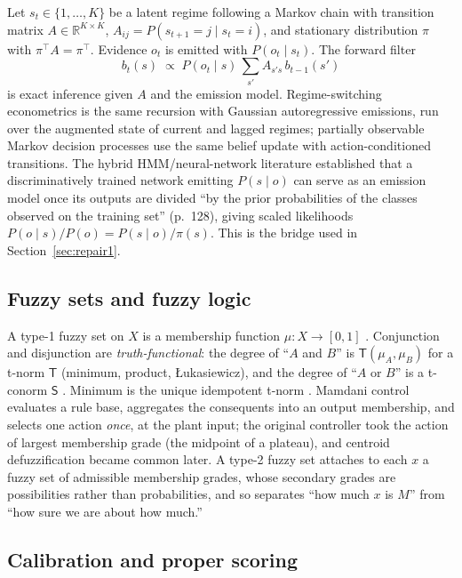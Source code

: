 \documentclass[11pt,a4paper]{article}
\numberwithin{equation}{section}
\theoremstyle{plain}
\theoremstyle{definition}
\theoremstyle{remark}
\newcommand{\R}{\mathbb{R}}
\begin{document}
Let $s_t \in \{1,\dots,K\}$ be a latent regime following a Markov chain with transition matrix $A \in \R^{K\times K}$, $A_{ij} = P(s_{t+1}=j \mid s_t=i)$, and stationary distribution $\pi$ with $\pi^\top A = \pi^\top$. Evidence $o_t$ is emitted with $P(o_t \mid s_t)$. The forward filter \citep{rabiner1989}
\begin{equation}\label{eq:filter}
b_t(s) \;\propto\; P(o_t \mid s)\,\sum_{s'} A_{s's}\, b_{t-1}(s')
\end{equation}
is exact inference given $A$ and the emission model. Regime-switching econometrics \citep{hamilton1989} is the same recursion with Gaussian autoregressive emissions, run over the augmented state of current and lagged regimes; partially observable Markov decision processes \citep{kaelbling1998} use the same belief update with action-conditioned transitions. The hybrid HMM/neural-network literature \citep{bourlard1994} established that a discriminatively trained network emitting $P(s\mid o)$ can serve as an emission model once its outputs are divided ``by the prior probabilities of the classes observed on the training set'' (p.~128), giving scaled likelihoods $P(o\mid s)/P(o) = P(s\mid o)/\pi(s)$. This is the bridge used in Section~\ref{sec:repair1}.

\subsection{Fuzzy sets and fuzzy logic}

A type-1 fuzzy set on $X$ is a membership function $\mu: X \to [0,1]$ \citep{zadeh1965}. Conjunction and disjunction are \emph{truth-functional}: the degree of ``$A$ and $B$'' is $\mathsf T(\mu_A,\mu_B)$ for a t-norm $\mathsf T$ (minimum, product, {\L}ukasiewicz), and the degree of ``$A$ or $B$'' is a t-conorm $\mathsf S$ \citep{klement2000}. Minimum is the unique idempotent t-norm \citep{klement2000}. Mamdani control \citep{mamdani1975} evaluates a rule base, aggregates the consequents into an output membership, and selects one action \emph{once}, at the plant input; the original controller took the action of largest membership grade (the midpoint of a plateau), and centroid defuzzification became common later. A type-2 fuzzy set \citep{zadeh1975,mendel2007} attaches to each $x$ a fuzzy set of admissible membership grades, whose secondary grades are possibilities rather than probabilities, and so separates ``how much $x$ is $M$'' from ``how sure we are about how much.''

\subsection{Calibration and proper scoring}
\end{document}
